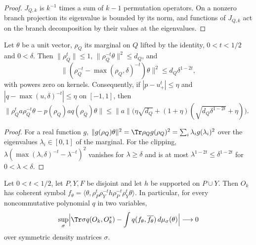 \begin{proof}\leanok
    $J_{Q,k}$ is $k^{-1}$ times a sum of $k-1$ permutation operators. On a nonzero branch
    projection its eigenvalue is bounded by its norm, and functions of $J_{Q,k}$ act on the
    branch decomposition by their values at the eigenvalues.
\end{proof}

\begin{lemma}
    \label{lem:marginal_powers}
    \leanok
    Let $\theta$ be a unit vector, $\rho_Q$ its marginal on $Q$ lifted by the identity,
    $0<t<1/2$ and $0<\delta$. Then $\|\rho_Q^t\|\le1$, $\|\rho_Q^{-t}\theta\|^2\le d_Q$, and
    \[
        \bigl\|(\rho_Q^{-t}-\max(\rho_Q,\delta)^{-t})\theta\bigr\|^2\le d_Q\delta^{1-2t},
    \]
    with powers zero on kernels. Consequently, if $|p-u_+^t|\le\eta$ and
    $|q-\max(u,\delta)^{-t}|\le\eta$ on $[-1,1]$, then
    $\|\rho_Q^ta\rho_Q^{-t}\theta-p(\rho_Q)aq(\rho_Q)\theta\|
    \le\|a\|\bigl(\eta\sqrt{d_Q}+(1+\eta)(\sqrt{d_Q\delta^{1-2t}}+\eta)\bigr)$.
\end{lemma}

\begin{proof}\leanok
    For a real function $g$, $\|g(\rho_Q)\theta\|^2=\Tr\rho_Qg(\rho_Q)^2=\sum_i\lambda_ig(\lambda_i)^2$
    over the eigenvalues $\lambda_i\in[0,1]$ of the marginal. For the clipping,
    $\lambda(\max(\lambda,\delta)^{-t}-\lambda^{-t})^2$ vanishes for $\lambda\ge\delta$ and
    is at most $\lambda^{1-2t}\le\delta^{1-2t}$ for $0<\lambda<\delta$.
\end{proof}

\begin{theorem}
    \label{thm:marked_similarity_symbol}
    \leanok
    Let $0<t<1/2$, let $P,Y,F$ be disjoint and let $h$ be supported on $P\cup Y$. Then
    $O_k$ has coherent symbol
    $f_\theta=\langle\theta,\rho_P^t\rho_Y^{-t}h\rho_P^{-t}\rho_Y^t\theta\rangle$. In
    particular, for every noncommutative polynomial $q$ in two variables,
    \[
        \sup_\sigma\Bigl|\Tr\sigma q(O_k,O_k^\ast)-\int q(f_\theta,\overline{f_\theta})
        \,d\mu_\sigma(\theta)\Bigr|\longrightarrow0
    \]
    over symmetric density matrices $\sigma$.
\end{theorem}


